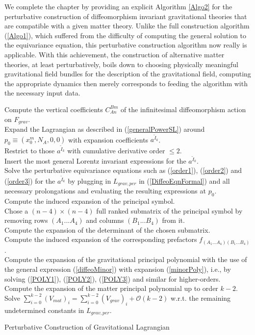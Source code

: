 We complete the chapter by providing an explicit Algorithm \ref{Algo2} for the perturbative construction of diffeomorphism invariant gravitational theories that are compatible with a given matter theory. 
Unlike the full construction algorithm (\ref{Algo1}), which suffered from the difficulty of computing the general solution to the equivariance equation, this perturbative construction algorithm now really is applicable. 
With this achievement, the construction of alternative matter theories, at least perturbatively, boils down to choosing physically meaningful gravitational field bundles for the description of the gravitational field, computing the appropriate dynamics then merely corresponds to feeding the algorithm with the necessary input data.  
\begin{algorithm}[hbt!]
\SetAlgoLined
{}
Compute the vertical coefficients $C^{Bm}_{An}$ of the infinitesimal diffeomorphism action on $F_{grav}$. \\
Expand the Lagrangian as described in (\ref{generalPowerSL}) around $p_0 \equiv (x_0^m,N_A,0,0)$ with expansion coefficients $a^{\tilde{I}_k}$.\\
Restrict to those $a^{\tilde{I}_k}$ with cumulative derivative order $\leq 2$.\\
Insert the most general Lorentz invariant expressions for the $a^{\tilde{I}_k}$.\\
Solve the perturbative equivariance equations such as (\ref{order1}), (\ref{order2}) and (\ref{order3}) for the $a^{\tilde{I}_k}$ by plugging in $L_{grav,per}$ in (\ref{DiffeoEqnFormal}) and all necessary prolongations and evaluating the resulting expressions at $p_0$.\\
Compute the induced expansion of the principal symbol.\\
Chose a $(n-4) \times (n-4)$ full ranked submatrix of the principal symbol by removing rows $(A_1...A_4)$ and columns $(B_1...B_4)$ from it. \\
Compute the expansion of the determinant of the chosen submatrix.\\
Compute the induced expansion of the corresponding prefactors $f_{(A_1...A_4)(B_1...B_4)}$. \\
Compute the expansion of the gravitational principal polynomial with the use of the general expression (\ref{diffeoMinor}) with expansion (\ref{minorPoly}), i.e., by solving (\ref{POLY1}), (\ref{POLY2}), (\ref{POLY3}) and similar for higher-orders. \\
Compute the expansion of the matter principal polynomial up to order $k-2$.\\
Solve $\sum_{i=0}^{k-2} (V_{mat})_i = \sum _{i=0}^{k-2}(V_{grav})_i + \mathcal{O}(k-2)$ w.r.t. the remaining undetermined constants in $L_{grav,per}$.
 \caption{Perturbative Construction of Gravitational Lagrangian}\label{Algo2}
\end{algorithm}

